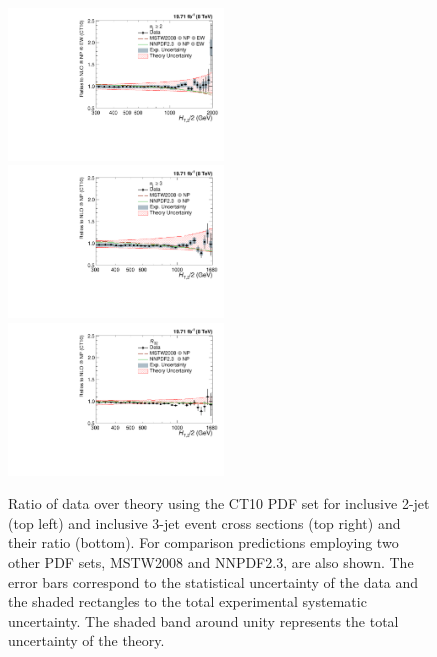 \begin{figure}[!h]
 \begin{center}
 \hspace*{-5mm}\includegraphics[width=0.51\textwidth]{Plots_HT_2_150/Comparison_data_NLO_Pdfs_2_EW.pdf}%
 ~~\includegraphics[width=0.51\textwidth]{Plots_HT_2_150/Comparison_data_NLO_Pdfs_3.pdf}\\
 \includegraphics[width=0.51\textwidth]{Plots_HT_2_150/Comparison_data_NLO_Pdfs_ratio_32.pdf}\\  
 \caption{Ratio of data over theory using the CT10 PDF set for inclusive 2-jet (top left) and inclusive 3-jet event cross sections (top right) and their ratio \ratio (bottom). For comparison predictions employing two other PDF sets, MSTW2008 and NNPDF2.3, are also shown. The error bars correspond to the statistical uncertainty of the data and the shaded rectangles to the total experimental systematic uncertainty. The shaded band around unity represents the total uncertainty of the theory.}
 \label{fig:data_NLOPdfs}
 \end{center}  
\end{figure}

